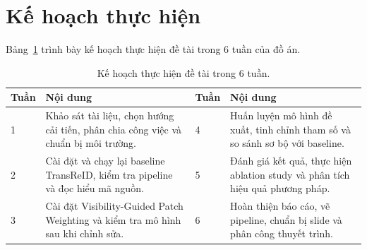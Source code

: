 \vspace{-6pt}
\section{Kế hoạch thực hiện}

Bảng~\ref{tab:plan} trình bày kế hoạch thực hiện đề tài trong 6 tuần của đồ án.

\renewcommand{\arraystretch}{1.5}
\begin{table}[H]
\centering
\begin{tabular}{|p{1cm}|p{7cm}|p{1cm}|p{7.5cm}|}
\hline
\textbf{Tuần} & \textbf{Nội dung} & \textbf{Tuần} & \textbf{Nội dung} \\ \hline

1 & Khảo sát tài liệu, chọn hướng cải tiến, phân chia công việc và chuẩn bị môi trường. 
&
4 & Huấn luyện mô hình đề xuất, tinh chỉnh tham số và so sánh sơ bộ với baseline. \\ \hline

2 & Cài đặt và chạy lại baseline TransReID, kiểm tra pipeline và đọc hiểu mã nguồn. 
&
5 & Đánh giá kết quả, thực hiện ablation study và phân tích hiệu quả phương pháp. \\ \hline

3 & Cài đặt Visibility-Guided Patch Weighting và kiểm tra mô hình sau khi chỉnh sửa. 
&
6 & Hoàn thiện báo cáo, vẽ pipeline, chuẩn bị slide và phân công thuyết trình. \\ \hline
\end{tabular}
\caption{Kế hoạch thực hiện đề tài trong 6 tuần.}
\label{tab:plan}
\end{table}